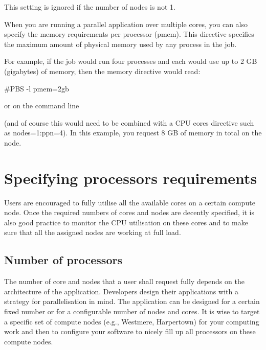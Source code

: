 This setting is ignored if the number of nodes is not 1.


When you are running a parallel application over multiple cores, you can also
specify the memory requirements per processor (pmem). This directive specifies
the maximum amount of physical memory used by any process in the job.

For example, if the job would run four processes and each would use up to 2 GB
(gigabytes) of memory, then the memory directive would read:

\begin{prompt}
#PBS -l pmem=2gb
\end{prompt}

or on the command line

\begin{prompt}
\end{prompt}

(and of course this would need to be combined with a CPU cores directive such as nodes=1:ppn=4).
In this example, you request 8 GB of memory in total on the node.

\section{Specifying processors requirements}

Users are encouraged to fully utilise all the available cores on a certain
compute node. Once the required numbers of cores and nodes are decently
specified, it is also good practice to monitor the CPU utilisation on these
cores and to make sure that all the assigned nodes are working at full load.

\subsection{Number of processors}

The number of core and nodes that a user shall request fully depends on the
architecture of the application. Developers design their applications with a
strategy for parallelisation in mind. The application can be designed for a
certain fixed number or for a configurable number of nodes and cores. It is
wise to target a specific set of compute nodes (e.g., Westmere, Harpertown) for
your computing work and then to configure your software to nicely fill up all
processors on these compute nodes.

